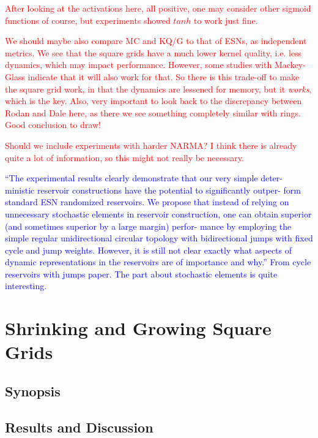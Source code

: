 \textcolor{red}{
  After looking at the activations here, all positive, one may consider other
sigmoid functions of course, but experiments showed $tanh$ to work just fine.
}

\textcolor{red}{
  We should maybe also compare MC and KQ/G to that of ESNs, as independent
metrics. We see that the square grids have a much lower kernel quality,
i.e. less dynamics, which may impact performance. However, some studies with
Mackey-Glass indicate that it will also work for that. So there is this
trade-off to make the square grid work, in that the dynamics are lessened for
memory, but it \textit{works}, which is the key. Also, very important to look
back to the discrepancy between Rodan and Dale here, as there we see something
completely similar with rings. Good conclusion to draw!
}

\textcolor{red}{
  Should we include experiments with harder NARMA? I think there is already
quite a lot of information, so this might not really be necessary.
}

\textcolor{blue}{
  ``The experimental results clearly demonstrate that our very simple deter-
ministic reservoir constructions have the potential to significantly outper-
form standard ESN randomized reservoirs. We propose that instead of relying on
unnecessary stochastic elements in reservoir construction, one can obtain
superior (and sometimes superior by a large margin) perfor- mance by employing
the simple regular unidirectional circular topology with bidirectional jumps
with fixed cycle and jump weights. However, it is still not clear exactly what
aspects of dynamic representations in the reservoirs are of importance and
why.'' From cycle reservoirs with jumps paper. The part about stochastic
elements is quite interesting.
}

\section{Shrinking and Growing Square Grids}

\subsection{Synopsis}

\subsection{Results and Discussion}

